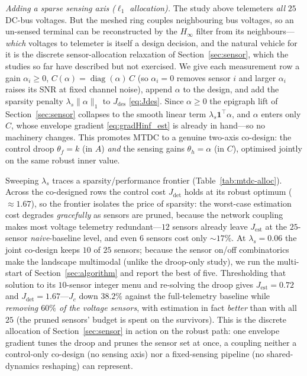 \documentclass[twocolumn,amsthm]{autart}
\begin{document}
\emph{Adding a sparse sensing axis ($\ell_1$ allocation).} The study above
telemeters \emph{all} $25$ DC-bus voltages. But the meshed ring couples
neighbouring bus voltages, so an un-sensed terminal can be reconstructed by the
$H_\infty$ filter from its neighbours---\emph{which} voltages to telemeter is
itself a design decision, and the natural vehicle for it is the discrete
sensor-allocation relaxation of Section~\ref{sec:sensor}, which the studies so far
have described but not exercised. We give each measurement row a gain
$\alpha_i\ge0$, $C(\alpha)=\operatorname{diag}(\alpha)\,C$ (so $\alpha_i=0$ removes
sensor $i$ and larger $\alpha_i$ raises its SNR at fixed channel noise), append
$\alpha$ to the design, and add the sparsity penalty $\lambda_s\lVert\alpha\rVert_1$
to $J_{\mathrm{des}}$ \eqref{eq:Jdes}. Since $\alpha\ge0$ the epigraph lift of
Section~\ref{sec:sensor} collapses to the smooth linear term
$\lambda_s\mathbf 1^\top\alpha$, and $\alpha$ enters only $C$, whose envelope
gradient \eqref{eq:gradHinf_est} is already in hand---so no machinery changes. This
promotes MTDC to a genuine two-axis co-design: the control droop $\theta_f=k$ (in
$A$) \emph{and} the sensing gains $\theta_h=\alpha$ (in $C$), optimised jointly on
the same robust inner value.

Sweeping $\lambda_s$ traces a sparsity/performance frontier
(Table~\ref{tab:mtdc-alloc}). Across the co-designed rows the control cost
$J_{\mathrm{det}}$ holds at its robust optimum (${\approx}1.67$), so the frontier
isolates the price of sparsity: the worst-case estimation cost degrades
\emph{gracefully} as sensors are pruned, because the network coupling makes most
voltage telemetry redundant---$12$ sensors already leave $J_{\mathrm{est}}$ at the
$25$-sensor \emph{naive}-baseline level, and even $6$ sensors cost only ${\sim}17\%$.
At $\lambda_s=0.06$ the joint co-design keeps $10$ of $25$ sensors; because the
sensor on/off combinatorics make the landscape multimodal (unlike the droop-only
study), we run the multi-start of Section~\ref{sec:algorithm} and report the best of
five. Thresholding that solution to its $10$-sensor integer menu and re-solving the
droop gives $J_{\mathrm{est}}=0.72$ and $J_{\mathrm{det}}=1.67$---$J_c$ down $38.2\%$
against the full-telemetry baseline while \emph{removing $60\%$ of the voltage
sensors}, with estimation in fact \emph{better} than with all $25$ (the pruned
sensors' budget is spent on the survivors). This is the discrete allocation of
Section~\ref{sec:sensor} in action on the robust path: one envelope gradient tunes
the droop and prunes the sensor set at once, a coupling neither a control-only
co-design (no sensing axis) nor a fixed-sensing pipeline (no shared-dynamics
reshaping) can represent.
\end{document}
